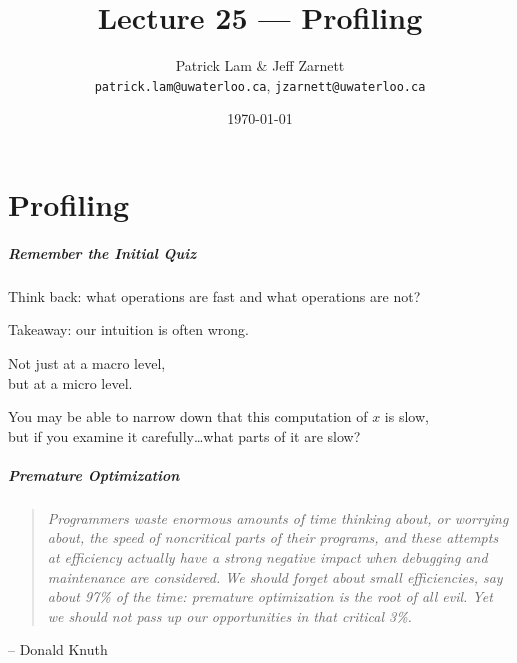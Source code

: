 

\title{Lecture 25 --- Profiling }

\author{Patrick Lam \& Jeff Zarnett \\ \small \texttt{patrick.lam@uwaterloo.ca}, \texttt{jzarnett@uwaterloo.ca}}
\date{\today}




\begin{frame}
  \titlepage

 \end{frame}



\part{Profiling}

\begin{frame}
\partpage
\end{frame}


\begin{frame}
\frametitle{Remember the Initial Quiz}


Think back: what operations are fast and what operations are not?

Takeaway: our intuition  is often wrong. 

Not just at a macro level, \\
but at a micro level. 

You may be able to narrow down that this computation of $x$ is slow, \\
but if you examine it carefully\ldots what parts of it are slow?


\end{frame}



\begin{frame}
\frametitle{Premature Optimization}

\vspace*{.5cm}

\begin{quote}
\textit{Programmers waste enormous amounts of time thinking about, or worrying about, the speed of noncritical parts of their programs, and these attempts at efficiency actually have a strong negative impact when debugging and maintenance are considered. We should forget about small efficiencies, say about 97\% of the time: premature optimization is the root of all evil. Yet we should not pass up our opportunities in that critical 3\%.}
\end{quote}
	\hfill -- Donald Knuth


\end{frame}



